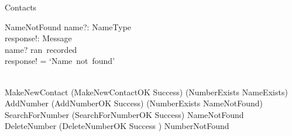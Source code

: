 \begin{class}{Contacts}
\begin{op}{NameNotFound}
    name?: NameType \\
    response!: Message \\
    \ST
    name? \notin ran~recorded \\
    response! = `Name~not~found'
\end{op}\\
MakeNewContact \sdef (MakeNewContactOK \wedge Success) \oplus (NumberExists \lor NameExists) \\
AddNumber \sdef (AddNumberOK \wedge Success) \oplus (NumberExists \lor NameNotFound) \\
SearchForNumber \sdef (SearchForNumberOK \wedge Success) \oplus NameNotFound \\
DeleteNumber \sdef (DeleteNumberOK \wedge Success ) \oplus NumberNotFound  \\
\end{class}
